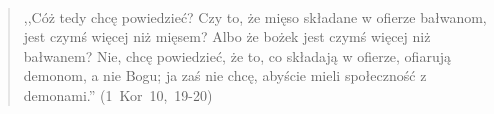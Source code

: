 \documentclass[10pt,a4paper,oneside]{article}
\begin{document}
\paragraph{}
\begin{quote}
,,Cóż tedy chcę powiedzieć? Czy to, że mięso składane w ofierze bałwanom, jest czymś więcej niż mięsem? Albo że bożek jest czymś więcej niż bałwanem? Nie, chcę powiedzieć, że to, co składają w ofierze, ofiarują demonom, a nie Bogu; ja zaś nie chcę, abyście mieli społeczność z demonami.'' \mbox{(1 Kor 10, 19-20)}
\end{quote}
\end{document}
